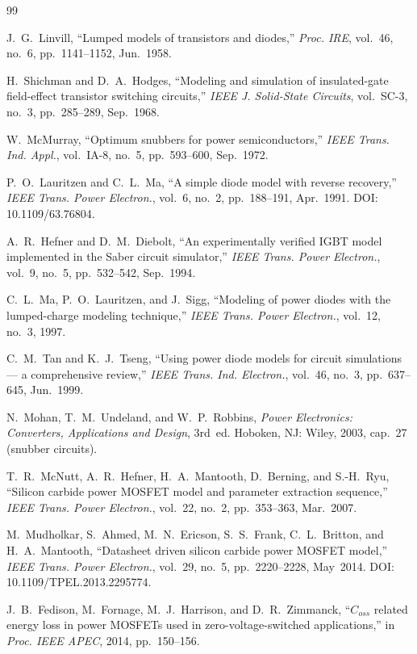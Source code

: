 \documentclass[11pt,a4paper]{article}
\begin{document}
\begin{thebibliography}{99}

 J.~G.~Linvill, ``Lumped models of transistors and
diodes,'' \emph{Proc. IRE}, vol.~46, no.~6, pp.~1141--1152, Jun.~1958.

 H.~Shichman and D.~A.~Hodges, ``Modeling and simulation
of insulated-gate field-effect transistor switching circuits,''
\emph{IEEE J. Solid-State Circuits}, vol.~SC-3, no.~3, pp.~285--289, Sep.~1968.

 W.~McMurray, ``Optimum snubbers for power
semiconductors,'' \emph{IEEE Trans. Ind. Appl.}, vol.~IA-8, no.~5,
pp.~593--600, Sep.~1972.

 P.~O.~Lauritzen and C.~L.~Ma, ``A simple diode model
with reverse recovery,'' \emph{IEEE Trans. Power Electron.}, vol.~6, no.~2,
pp.~188--191, Apr.~1991. DOI: 10.1109/63.76804.

 A.~R.~Hefner and D.~M.~Diebolt, ``An experimentally
verified IGBT model implemented in the Saber circuit simulator,''
\emph{IEEE Trans. Power Electron.}, vol.~9, no.~5, pp.~532--542, Sep.~1994.

 C.~L.~Ma, P.~O.~Lauritzen, and J.~Sigg, ``Modeling of power
diodes with the lumped-charge modeling technique,'' \emph{IEEE Trans. Power
Electron.}, vol.~12, no.~3, 1997.

 C.~M.~Tan and K.~J.~Tseng, ``Using power diode models for
circuit simulations --- a comprehensive review,'' \emph{IEEE Trans. Ind.
Electron.}, vol.~46, no.~3, pp.~637--645, Jun.~1999.

 N.~Mohan, T.~M.~Undeland, and W.~P.~Robbins, \emph{Power
Electronics: Converters, Applications and Design}, 3rd~ed. Hoboken, NJ: Wiley,
2003, cap.~27 (snubber circuits).

 T.~R.~McNutt, A.~R.~Hefner, H.~A.~Mantooth, D.~Berning,
and S.-H.~Ryu, ``Silicon carbide power MOSFET model and parameter extraction
sequence,'' \emph{IEEE Trans. Power Electron.}, vol.~22, no.~2, pp.~353--363,
Mar.~2007.

 M.~Mudholkar, S.~Ahmed, M.~N.~Ericson, S.~S.~Frank,
C.~L.~Britton, and H.~A.~Mantooth, ``Datasheet driven silicon carbide power
MOSFET model,'' \emph{IEEE Trans. Power Electron.}, vol.~29, no.~5,
pp.~2220--2228, May~2014. DOI: 10.1109/TPEL.2013.2295774.

 J.~B.~Fedison, M.~Fornage, M.~J.~Harrison, and
D.~R.~Zimmanck, ``$C_{oss}$ related energy loss in power MOSFETs used in
zero-voltage-switched applications,'' in \emph{Proc. IEEE APEC}, 2014,
pp.~150--156.


\end{thebibliography}
\end{document}
